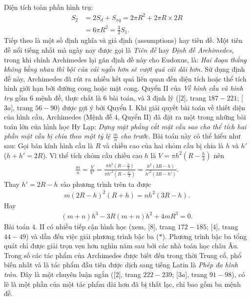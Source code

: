 \begin{multicols}{2}
\begin{align*}
	\end{align*}
	Diện tích toàn phần hình trụ: 
	\begin{align*}
		{S_2} &= 2{S_d} + {S_{xq}} = 2\pi {R^2} + 2\pi R\times2R \\
		&= 6\pi {R^2} = \frac{3}{2}{S_1}.
	\end{align*}
	Tiếp theo là một số định nghĩa và giả định (assumptions) hay tiên đề. Một tiên đề nổi tiếng nhất mà ngày nay được gọi là \textit{Tiên đề} hay \textit{Định đề Archimedes}, trong khi chính Archimedes lại gán định đề này cho Eudoxus, là:  
	\vskip 0.1cm
	\textit{Hai đoạn thẳng không bằng nhau thì bội của cái ngắn hơn sẽ vượt quá cái dài hơn.}
	\vskip 0.1cm 
	Sử dụng định đề này, Archimedes đã rút ra nhiều kết quả liên quan đến diện tích hoặc thể tích hình giới hạn bởi đường cong hoặc mặt cong.
	\vskip 0.1cm
	Quyển II của \textit{Về hình cầu và hình trụ} gồm $6$ mệnh đề, thực chất là $6$ bài toán, và $3$ định lý ([$2$], trang $187-221$; [$3a$], trang $56-90$) được gợi ý bởi Quyển I. Khi giải quyết bài toán về thiết diện của hình cầu, Archimedes (Mệnh đề $4$, Quyển II) đã đặt ra một trong những bài toán lớn của hình học Hy Lạp: 
	\vskip 0.1cm
	\textit{Dựng mặt phẳng cắt mặt cầu sao cho thể tích hai phần mặt cầu bị chia theo một tỷ lệ $\frac{m}{n}$ cho trước.} 
	\vskip 0.1cm
	Bài toán này có thể hiểu như sau: Gọi bán kính hình cầu là $R$  và chiều cao của hai chỏm cầu bị chia là $h$  và $h'$  ($h+ h'= 2R$). Vì thể tích chỏm cầu chiều cao $h$ là $V = \pi {h^2}\left( {R - \frac{h}{3}} \right)$  nên 
	\begin{align*}
		\frac{m}{n} = \frac{V}{{V'}} = \frac{{\pi {h^2}\left( {R - \frac{h}{3}} \right)}}{{\pi {{h'}^2}\left( {R - \frac{{h'}}{3}} \right)}} = \frac{{{h^2}\left( {3R - h} \right)}}{{{{h'}^2}\left( {3R - h'} \right)}}.
	\end{align*}
	Thay $h' = 2R - h$  vào phương trình trên ta được
	\begin{align*}
		m{\left( {2R - h} \right)^2}\left( {R + h} \right) = n{h^2}\left( {3R - h} \right).
	\end{align*}
	Hay 
	\begin{align*}
		\left( {m \!+\! n} \right){h^3} \!-\! 3R\left( {m \!+\! n} \right){h^2} \!+\! 4m{R^3} \!=\! 0. \tag{$*$}
	\end{align*}
	Bài toán $4.$ II có nhiều tiếp cận hình học (xem, [$8$], trang $172-185$; [$4$], trang $44-49$) và dẫn đến việc giải phương trình bậc ba ($*$). Phương trình bậc ba tổng quát chỉ được giải trọn vẹn hơn nghìn năm sau bởi các nhà toán học châu Âu.
	\vskip 0.1cm
	Trong số các tác phẩm của Archimedes được biết đến trong thời Trung cổ, phổ biến nhất và là tác phẩm đầu tiên được dịch sang tiếng Latin là \textit{Phép đo hình tròn}. Đây là một chuyên luận ngắn ([$2$], trang $222-239$; [$3a$], trang $91-98$), có lẽ là một phần của một tác phẩm dài hơn đã bị thất lạc, chỉ bao gồm ba mệnh đề. 

\end{multicols}
